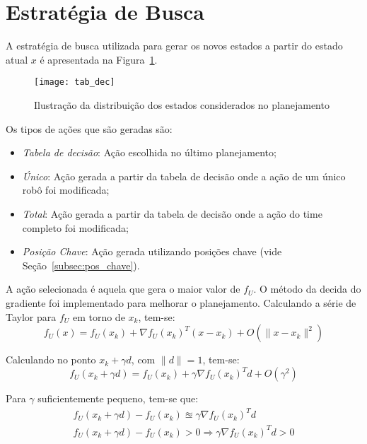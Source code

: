 \section{Estratégia de Busca}\label{sec:est_busca}

A estratégia de busca utilizada para gerar os novos estados a partir do estado
atual $x$ é apresentada na Figura~\ref{fig:estr_busca}.

\begin{figure}[H]
  \centering
  \texttt{[image: tab\_dec]}
  \caption{Ilustração da distribuição dos estados
           considerados no planejamento}\label{fig:estr_busca}
\end{figure}

Os tipos de ações que são geradas são:
\begin{itemize}
  \item \textit{Tabela de decisão}: Ação escolhida no último planejamento;
  \item \textit{Único}: Ação gerada a partir da tabela de decisão onde a ação de
    um único robô foi modificada;
  \item \textit{Total}: Ação gerada a partir da tabela de decisão onde a ação do
    time completo foi modificada;
  \item \textit{Posição Chave}: Ação gerada utilizando posições chave (vide
    Seção~\ref{subsec:pos_chave}).
\end{itemize}

A ação selecionada é aquela que gera o maior valor de $f_U$.
O método da decida do gradiente foi implementado para melhorar
o planejamento. Calculando a série de Taylor para $f_U$ em torno
de $x_k$, tem-se:
\begin{dmath}
  f_U(x) = f_U(x_k) + \nabla f_U(x_k)^T(x-x_k) + O(\lVert x - x_k\rVert^2)
\end{dmath} 

Calculando no ponto $x_k + \gamma d$, com $\lVert d \rVert = 1$, tem-se:
\begin{dmath}
  f_U(x_k + \gamma d) = f_U(x_k) + \gamma \nabla f_U(x_k)^Td + O(\gamma^2)
\end{dmath} 

Para $\gamma$ suficientemente pequeno, tem-se que:
\begin{multline}
  f_U(x_k + \gamma d) - f_U(x_k) \approxeq \gamma \nabla f_U(x_k)^Td\\
  f_U(x_k + \gamma d) - f_U(x_k) > 0 \Rightarrow \gamma \nabla f_U(x_k)^Td > 0
\end{multline} 

